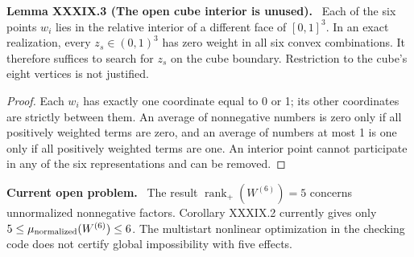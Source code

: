 \documentclass[11pt,a4paper,oneside]{book}
\DeclareMathOperator{\rank}{rank}\DeclareMathOperator{\Tr}{Tr}
\newcommand{\statement}[3]{\par\medskip\noindent\textbf{#1 #2 (#3).}\ }
\newcommand{\note}[1]{\par\medskip\noindent\textbf{#1}\ }
\begin{document}
\statement{Lemma}{XXXIX.3}{The open cube interior is unused}
Each of the six points $w_i$ lies in the relative interior of a different face of $[0,1]^3$. In an exact realization, every $z_s\in(0,1)^3$ has zero weight in all six convex combinations. It therefore suffices to search for $z_s$ on the cube boundary. Restriction to the cube's eight vertices is not justified.
\begin{proof}
Each $w_i$ has exactly one coordinate equal to 0 or 1; its other coordinates are strictly between them. An average of nonnegative numbers is zero only if all positively weighted terms are zero, and an average of numbers at most 1 is one only if all positively weighted terms are one. An interior point cannot participate in any of the six representations and can be removed.
\end{proof}
\note{Current open problem.} The result $\rank_+(W^{(6)})=5$ concerns unnormalized nonnegative factors. Corollary XXXIX.2 currently gives only $5\le\mu_{\rm normalized}(W^{(6)})\le6$. The multistart nonlinear optimization in the checking code does not certify global impossibility with five effects.
\end{document}
